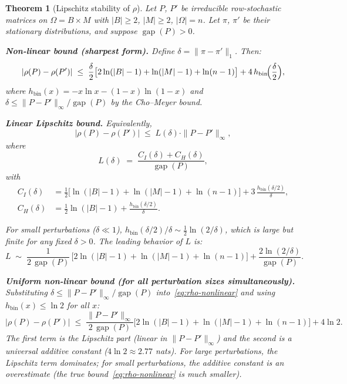 \documentclass[11pt]{article}
\newtheorem{theorem}{Theorem}
\DeclareMathOperator{\gap}{gap}
\begin{document}
\begin{theorem}[Lipschitz stability of $\rho$]\label{thm:lipschitz}
Let $P$, $P'$ be irreducible row-stochastic matrices on
$\Omega = B \times M$ with $|B| \ge 2$, $|M| \ge 2$, $|\Omega| = n$.
Let $\pi$, $\pi'$ be their stationary distributions, and suppose
$\gap(P) > 0$.

\medskip\noindent
\textbf{Non-linear bound (sharpest form).}
Define $\delta = \|\pi - \pi'\|_1$.  Then:
\begin{equation}\label{eq:rho-nonlinear}
  |\rho(P) - \rho(P')| \;\le\;
  \frac{\delta}{2}\bigl[2\ln(|B|-1) + \ln(|M|-1) + \ln(n-1)\bigr]
  + 4\,h_{\mathrm{bin}}\!\Bigl(\frac{\delta}{2}\Bigr),
\end{equation}
where $h_{\mathrm{bin}}(x) = -x\ln x - (1-x)\ln(1-x)$ and
$\delta \le \|P - P'\|_\infty / \gap(P)$ by the Cho--Meyer bound.

\medskip\noindent
\textbf{Linear Lipschitz bound.}
Equivalently,
\begin{equation}\label{eq:lipschitz-bound}
  |\rho(P) - \rho(P')| \;\le\; L(\delta) \cdot \|P - P'\|_\infty,
\end{equation}
where
\begin{equation}\label{eq:L-explicit}
  L(\delta) \;=\; \frac{C_I(\delta) + C_H(\delta)}{\gap(P)},
\end{equation}
with
\begin{align}
  C_I(\delta) &= \frac{1}{2}\bigl[\ln(|B|-1) + \ln(|M|-1) + \ln(n-1)\bigr]
         + 3\,\frac{h_{\mathrm{bin}}(\delta/2)}{\delta}, \label{eq:CI} \\
  C_H(\delta) &= \frac{1}{2}\ln(|B|-1) + \frac{h_{\mathrm{bin}}(\delta/2)}{\delta}. \label{eq:CH}
\end{align}

For small perturbations ($\delta \ll 1$),
$h_{\mathrm{bin}}(\delta/2)/\delta \sim \frac{1}{2}\ln(2/\delta)$,
which is large but finite for any fixed $\delta > 0$.
The leading behavior of $L$ is:
\begin{equation}\label{eq:L-leading}
  L \;\sim\; \frac{1}{2\,\gap(P)}\,
  \bigl[2\ln(|B|-1) + \ln(|M|-1) + \ln(n-1)\bigr]
  + \frac{2\ln(2/\delta)}{\gap(P)}.
\end{equation}

\medskip\noindent
\textbf{Uniform non-linear bound (for all perturbation sizes simultaneously).}
Substituting $\delta \le \|P-P'\|_\infty/\gap(P)$ into~\eqref{eq:rho-nonlinear}
and using $h_{\mathrm{bin}}(x) \le \ln 2$ for all $x$:
\begin{equation}\label{eq:rho-uniform}
  |\rho(P) - \rho(P')| \;\le\;
  \frac{\|P-P'\|_\infty}{2\,\gap(P)}\bigl[2\ln(|B|-1) + \ln(|M|-1)
  + \ln(n-1)\bigr] + 4\ln 2.
\end{equation}
The first term is the Lipschitz part (linear in $\|P-P'\|_\infty$)
and the second is a universal additive constant ($4\ln 2 \approx 2.77$ nats).
For large perturbations, the Lipschitz term dominates; for small
perturbations, the additive constant is an overestimate (the true
bound~\eqref{eq:rho-nonlinear} is much smaller).


\end{theorem}
\end{document}
